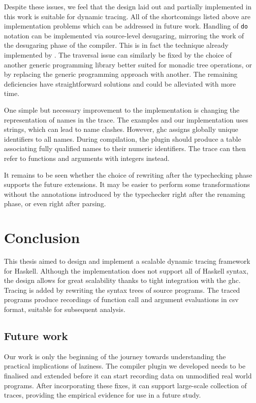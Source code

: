 \documentclass[thesis=B,english]{FITthesis}[2019/12/23]
\newcommand{\hsCode}[1]{\texttt{#1}}
\begin{document}
Despite these issues, we feel that the design laid out and partially
implemented in this work is suitable for dynamic tracing. All of the
shortcomings listed above are implementation problems which can be addressed in
future work. Handling of \hsCode{do} notation can be implemented via
source-level desugaring, mirroring the work of the desugaring phase of the
compiler. This is in fact the technique already implemented by
. The traversal issue can similarly be fixed by the choice of
another generic programming library better suited for monadic tree operations,
or by replacing the generic programming approach with another. The remaining
deficiencies have straightforward solutions and could be alleviated with more
time.

One simple but necessary improvement to the implementation is changing the
representation of names in the trace. The examples and our implementation uses
strings, which can lead to name clashes. However, \acrshort{ghc} assigns
globally unique identifiers to all names. During compilation, the plugin should
produce a table associating fully qualified names to their numeric identifiers.
The trace can then refer to functions and arguments with integers instead.

It remains to be seen whether the choice of rewriting after the typechecking
phase supports the future extensions. It may be easier to perform some
transformations without the annotations introduced by the typechecker right
after the renaming phase, or even right after parsing.

\chapter{Conclusion}

This thesis aimed to design and implement a scalable dynamic tracing framework
for Haskell. Although the implementation does not support all of Haskell
syntax, the design allows for great scalability thanks to tight integration
with the \acrlong{ghc}. Tracing is added by rewriting the syntax trees of
source programs. The traced programs produce recordings of function call and
argument evaluations in \acrshort{csv} format, suitable for subsequent
analysis.

\section*{Future work}
Our work is only the beginning of the journey towards understanding the
practical implications of laziness. The compiler plugin we developed needs to
be finalised and extended before it can start recording data on unmodified real
world programs. After incorporating these fixes, it can support large-scale
collection of traces, providing the empirical evidence for use in a future
study.
\end{document}
